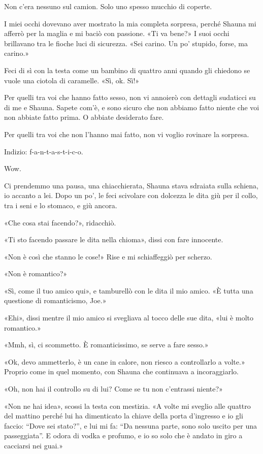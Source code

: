 Non c'era nessuno sul camion. Solo uno spesso mucchio di coperte.

I miei occhi dovevano aver mostrato la mia completa sorpresa, perché
Shauna mi afferrò per la maglia e mi baciò con passione. «Ti va bene?» I
suoi occhi brillavano tra le fioche luci di sicurezza. «Sei carino. Un
po' stupido, forse, ma carino.»

Feci di sì con la testa come un bambino di quattro anni quando gli
chiedono se vuole una ciotola di caramelle. «Sì, ok. Sì!»

\hfill\break

Per quelli tra voi che hanno fatto sesso, non vi annoierò con dettagli
sudaticci su di me e Shauna. Sapete com'è, e sono sicuro che non abbiamo
fatto niente che voi non abbiate fatto prima. O abbiate desiderato fare.

Per quelli tra voi che non l'hanno mai fatto, non vi voglio rovinare la
sorpresa.

Indizio: f-a-n-t-a-s-t-i-c-o.

Wow.

\hfill\break

Ci prendemmo una pausa, una chiacchierata, Shauna stava sdraiata sulla
schiena, io accanto a lei. Dopo un po', le feci scivolare con dolcezza
le dita giù per il collo, tra i seni e lo stomaco, e giù ancora.

«Che cosa stai facendo?», ridacchiò.

«Ti sto facendo passare le dita nella chioma», dissi con fare innocente.

«Non è così che stanno le cose!» Rise e mi schiaffeggiò per scherzo.

«Non è romantico?»

«Sì, come il tuo amico qui», e tamburellò con le dita il mio amico. «È
tutta una questione di romanticismo, Joe.»

«Ehi», dissi mentre il mio amico si svegliava al tocco delle sue dita,
«lui è molto romantico.»

«Mmh, sì, ci scommetto. È romanticissimo, se serve a fare sesso.»

«Ok, devo ammetterlo, è un cane in calore, non riesco a controllarlo a
volte.» Proprio come in quel momento, con Shauna che continuava a
incoraggiarlo.

«Oh, non hai il controllo su di lui? Come se tu non c'entrassi niente?»

«Non ne hai idea», scossi la testa con mestizia. «A volte mi sveglio
alle quattro del mattino perché lui ha dimenticato la chiave della porta
d'ingresso e io gli faccio: ``Dove sei stato?'', e lui mi fa: ``Da
nessuna parte, sono solo uscito per una passeggiata''. E odora di vodka
e profumo, e io so solo che è andato in giro a cacciarsi nei guai.»

